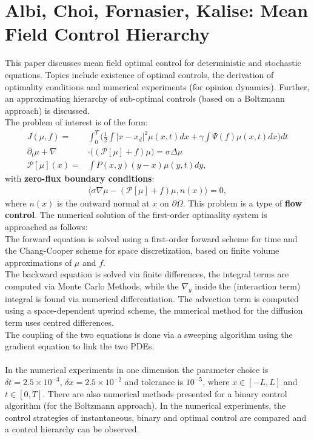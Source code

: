 \documentclass[11pt, a4paper]{article}
\theoremstyle{definition}
\begin{document}
\section{Albi, Choi, Fornasier, Kalise: Mean Field Control Hierarchy \cite{albi2016mean}}
This paper discusses mean field optimal control for deterministic and stochastic equations. Topics include existence of optimal controls, the derivation of optimality conditions and numerical experiments (for opinion dynamics). Further, an approximating hierarchy of sub-optimal controls (based on a Boltzmann approach) is discussed. \\
The problem of interest is of the form:
\begin{align*}
J(\mu, f) =& \int_0^T \bigg(\frac{1}{2} \int |x-x_d|^2 \mu(x,t)dx + \gamma \int \Psi(f)\mu(x,t)dx\bigg) dt\\
\partial_t \mu + \nabla & \cdot \bigg( (\mathcal{P}[\mu] +f)\mu \bigg) =\sigma \Delta \mu\\
\mathcal{P}[\mu](x) =& \int P(x,y)(y-x)\mu(y,t)dy,
\end{align*}
with \textbf{zero-flux boundary conditions}:
\begin{align*}
\langle \sigma \nabla \mu - (\mathcal{P}[\mu] +f)\mu, n(x) \rangle=0,
\end{align*}
where $n(x)$ is the outward normal at $ x $ on $\partial \Omega$. This problem is a type of \textbf{flow control}.
The numerical solution of the first-order optimality system is approached as follows:\\
The forward equation is solved using a first-order forward scheme for time and the Chang-Cooper scheme for space discretization, based on finite volume approximations of $\mu$ and $f$. \\
The backward equation is solved via finite differences, the integral terms are computed via Monte Carlo Methods, while the $\nabla_y$ inside the (interaction term) integral is found via numerical differentiation. The advection term is computed using a space-dependent upwind scheme, the numerical method for the diffusion term uses centred differences.\\
The coupling of the two equations is done via a sweeping algorithm using the gradient equation to link the two PDEs.\\
\\
In the numerical experiments in one dimension the parameter choice is $\delta t = 2.5 \times 10^{-3}$, $\delta x = 2.5 \times 10^{-2}$ and tolerance is $10^{-5}$, where $x \in [-L,L]$ and $t \in [0,T]$.
There are also numerical methods presented for a binary control algorithm (for the Boltzmann approach).
In the numerical experiments, the control strategies of instantaneous, binary and optimal control are compared and a control hierarchy can be observed. 
\end{document}

